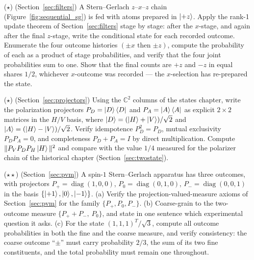 \begin{problemset}
\item ($\star$) (Section~\ref{sec:filters}) A Stern--Gerlach $z$--$x$--$z$ chain (Figure~\ref{fig:sequential_sg}) is fed with atoms prepared in $\ket{+z}$. Apply the rank-1 update theorem of Section~\ref{sec:filters} stage by stage: after the $x$-stage, and again after the final $z$-stage, write the conditional state for each recorded outcome. Enumerate the four outcome histories $({\pm x}\text{ then }{\pm z})$, compute the probability of each as a product of stage probabilities, and verify that the four joint probabilities sum to one. Show that the final counts are $+z$ and $-z$ in equal shares $1/2$, whichever $x$-outcome was recorded --- the $x$-selection has re-prepared the state.

\item ($\star$) (Section~\ref{sec:projectors}) Using the $\mathbb{C}^2$ columns of the states chapter, write the polarization projectors $P_D = \ket{D}\bra{D}$ and $P_A = \ket{A}\bra{A}$ as explicit $2\times2$ matrices in the $H/V$ basis, where $\ket{D} = (\ket{H}+\ket{V})/\sqrt{2}$ and $\ket{A} = (\ket{H}-\ket{V})/\sqrt{2}$. Verify idempotence $P_D^2 = P_D$, mutual exclusivity $P_D P_A = 0$, and completeness $P_D + P_A = I$ by direct multiplication. Compute $\|P_V P_D P_H\ket{H}\|^2$ and compare with the value $1/4$ measured for the polarizer chain of the historical chapter (Section~\ref{sec:twostate}).

\item ($\star\star$) (Section~\ref{sec:pvm}) A spin-$1$ Stern--Gerlach apparatus has three outcomes, with projectors $P_+ = \operatorname{diag}(1,0,0)$, $P_0 = \operatorname{diag}(0,1,0)$, $P_- = \operatorname{diag}(0,0,1)$ in the basis $\{\ket{+1},\ket{0},\ket{-1}\}$. (a) Verify the projection-valued-measure axioms of Section~\ref{sec:pvm} for the family $\{P_+,P_0,P_-\}$. (b) Coarse-grain to the two-outcome measure $\{P_+ + P_-,\ P_0\}$, and state in one sentence which experimental question it asks. (c) For the state $(1,1,1)^{T}/\sqrt{3}$, compute all outcome probabilities in both the fine and the coarse measure, and verify consistency: the coarse outcome ``$\pm$'' must carry probability $2/3$, the sum of its two fine constituents, and the total probability must remain one throughout.


\end{problemset}

